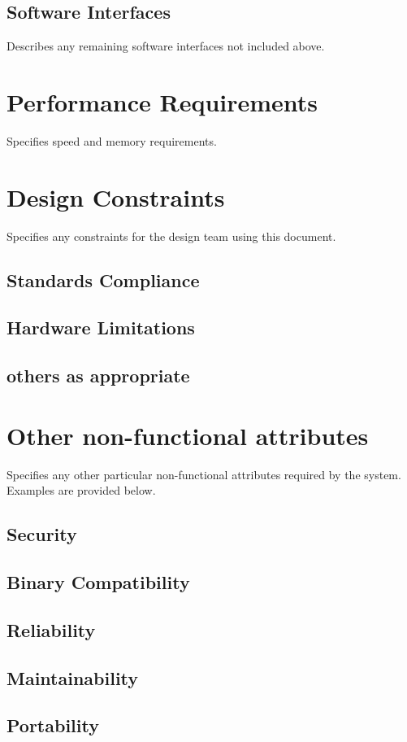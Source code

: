 \documentclass[12pt]{article}
\begin{document}
\subsection{Software Interfaces}
Describes any remaining software interfaces not included above. 
\section{Performance Requirements}
Specifies speed and memory requirements. 
\section{Design Constraints}
Specifies any constraints for the design team using this document. 
\subsection{ Standards Compliance}
\subsection{ Hardware Limitations}
\subsection{ others as appropriate}

\section{Other non-functional attributes}
Specifies any other particular non-functional attributes required by the system. Examples are provided below. 
\subsection {Security}
\subsection {Binary Compatibility}
\subsection {Reliability}
\subsection {Maintainability}
\subsection {Portability}
\end{document}
